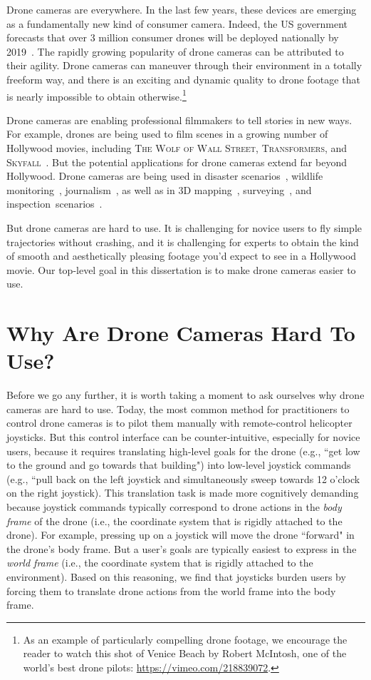 
Drone cameras are everywhere.
In the last few years, these devices are emerging as a fundamentally new kind of consumer camera.
Indeed, the US government forecasts that over 3 million consumer drones will be deployed nationally by 2019~\cite{?}.
The rapidly growing popularity of drone cameras can be attributed to their agility. Drone cameras can maneuver through their environment in a totally freeform way, and there is an exciting and dynamic quality to drone footage that is nearly impossible to obtain otherwise.\footnote{As an example of particularly compelling drone footage, we encourage the reader to watch this shot of Venice Beach by Robert McIntosh, one of the world's best drone pilots: \url{https://vimeo.com/218839072}.}

Drone cameras are enabling professional filmmakers to tell stories in new ways. 
For example, drones are being used to film scenes in a growing number of Hollywood movies, including \textsc{The Wolf of Wall Street}, \textsc{Transformers}, and \textsc{Skyfall}~\cite{?}.
But the potential applications for drone cameras extend far beyond Hollywood.
Drone cameras are being used in disaster scenarios~\cite{?}, wildlife monitoring~\cite{?}, journalism~\cite{?}, as well as in 3D mapping~\cite{?}, surveying~\cite{?}, and inspection~scenarios~\cite{?}.

But drone cameras are hard to use.
It is challenging for novice users to fly simple trajectories without crashing, and it is challenging for experts to obtain the kind of smooth and aesthetically pleasing footage you'd expect to see in a Hollywood movie.
Our top-level goal in this dissertation is to make drone cameras easier to use.

\section{Why Are Drone Cameras Hard To Use?}

Before we go any further, it is worth taking a moment to ask ourselves why drone cameras are hard to use.
Today, the most common method for practitioners to control drone cameras is to pilot them manually with remote-control helicopter joysticks.
But this control interface can be counter-intuitive, especially for novice users, because it requires translating high-level goals for the drone (e.g., ``get low to the ground and go towards that building") into low-level joystick commands (e.g., ``pull back on the left joystick and simultaneously sweep towards 12 o'clock on the right joystick).
This translation task is made more cognitively demanding because joystick commands typically correspond to drone actions in the \emph{body frame} of the drone (i.e., the coordinate system that is rigidly attached to the drone). 
For example, pressing up on a joystick will move the drone ``forward" in the drone's body frame.
But a user's goals are typically easiest to express in the \emph{world frame} (i.e., the coordinate system that is rigidly attached to the environment).
Based on this reasoning, we find that joysticks burden users by forcing them to translate drone actions from the world frame into the body frame.

